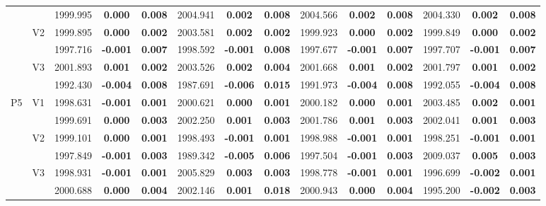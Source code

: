 \documentclass[12pt,a4paper]{article}
\begin{document}
\begin{sidewaystable}[H]
{\begin{tabular}{cc|ccc|ccc|ccc|ccc|}
   &  & 1999.995 & \textbf{0.000} & \textbf{0.008} & 2004.941 & \textbf{0.002} & \textbf{0.008} & 2004.566 & \textbf{0.002} & \textbf{0.008} & 2004.330 & \textbf{0.002} & \textbf{0.008} \\ 
   & \multirow{2}{*}{V2} & 1999.895 & \textbf{0.000} & \textbf{0.002} & 2003.581 & \textbf{0.002} & \textbf{0.002} & 1999.923 & \textbf{0.000} & \textbf{0.002} & 1999.849 & \textbf{0.000} & \textbf{0.002} \\ 
   &  & 1997.716 & \textbf{-0.001} & \textbf{0.007} & 1998.592 & \textbf{-0.001} & \textbf{0.008} & 1997.677 & \textbf{-0.001} & \textbf{0.007} & 1997.707 & \textbf{-0.001} & \textbf{0.007} \\ 
   & \multirow{2}{*}{V3} & 2001.893 & \textbf{0.001} & \textbf{0.002} & 2003.526 & \textbf{0.002} & \textbf{0.004} & 2001.668 & \textbf{0.001} & \textbf{0.002} & 2001.797 & \textbf{0.001} & \textbf{0.002} \\ 
   &  & 1992.430 & \textbf{-0.004} & \textbf{0.008} & 1987.691 & \textbf{-0.006} & \textbf{0.015} & 1991.973 & \textbf{-0.004} & \textbf{0.008} & 1992.055 & \textbf{-0.004} & \textbf{0.008} \\ 
   \hline \hline\multirow{6}{*}{P5} & \multirow{2}{*}{V1} & 1998.631 & \textbf{-0.001} & \textbf{0.001} & 2000.621 & \textbf{0.000} & \textbf{0.001} & 2000.182 & \textbf{0.000} & \textbf{0.001} & 2003.485 & \textbf{0.002} & \textbf{0.001} \\ 
   &  & 1999.691 & \textbf{0.000} & \textbf{0.003} & 2002.250 & \textbf{0.001} & \textbf{0.003} & 2001.786 & \textbf{0.001} & \textbf{0.003} & 2002.041 & \textbf{0.001} & \textbf{0.003} \\ 
   & \multirow{2}{*}{V2} & 1999.101 & \textbf{0.000} & \textbf{0.001} & 1998.493 & \textbf{-0.001} & \textbf{0.001} & 1998.988 & \textbf{-0.001} & \textbf{0.001} & 1998.251 & \textbf{-0.001} & \textbf{0.001} \\ 
   &  & 1997.849 & \textbf{-0.001} & \textbf{0.003} & 1989.342 & \textbf{-0.005} & \textbf{0.006} & 1997.504 & \textbf{-0.001} & \textbf{0.003} & 2009.037 & \textbf{0.005} & \textbf{0.003} \\ 
   & \multirow{2}{*}{V3} & 1998.931 & \textbf{-0.001} & \textbf{0.001} & 2005.829 & \textbf{0.003} & \textbf{0.003} & 1998.778 & \textbf{-0.001} & \textbf{0.001} & 1996.699 & \textbf{-0.002} & \textbf{0.001} \\ 
   &  & 2000.688 & \textbf{0.000} & \textbf{0.004} & 2002.146 & \textbf{0.001} & \textbf{0.018} & 2000.943 & \textbf{0.000} & \textbf{0.004} & 1995.200 & \textbf{-0.002} & \textbf{0.003} \\ 

\end{tabular}}
\end{sidewaystable}
\end{document}
